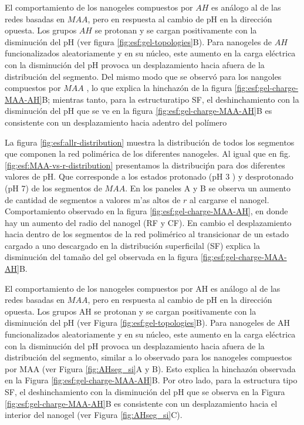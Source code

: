 El comportamiento de los nanogeles compuestos por $AH$ es an\'alogo al de las redes basadas en $MAA$, pero en respuesta al cambio de pH en la direcci\'on opuesta.
Los grupos $AH$ se protonan y se cargan positivamente con la disminuci\'on del pH (ver figura \ref{fig:esf:gel-topologies}B).
Para nanogeles de $AH$ funcionalizados aleatoriamente y en su n\'ucleo, este aumento en la carga el\'ectrica con la disminución del pH provoca un desplazamiento hacia afuera de la distribuci\'on del segmento. Del mismo modo que se observ\'o para los nangoles compuestos por $MAA$%
, lo que explica la hinchaz\'on de la figura \ref{fig:esf:gel-charge-MAA-AH}B;
mientras tanto, para la estructuratipo SF, el deshinchamiento con la disminuci\'on del pH que se ve en la figura \ref{fig:esf:gel-charge-MAA-AH}B es consistente con un desplazamiento hacia adentro del pol\'imero %


La figura \ref{fig:esf:allr-distribution} muestra la distribuci\'on de todos los segmentos que componen la red polim\'erica de los diferentes nanogeles. 
Al igual que en fig. \ref{fig:esf:MAA-vs-r-distribution} presentamos la distribuci\'pn para dos diferentes valores de pH. Que corresponde a los estados protonado (pH 3 ) y desprotonado (pH 7) de los segmentos de $MAA$.  En los paneles A y B se observa un aumento de cantidad de segmentos a valores m'as altos de $r$ al cargarse el nanogel. Comportamiento observado en la figura \ref{fig:esf:gel-charge-MAA-AH}, en donde hay un aumento del radio del nanogel (RF y CF).
En cambio el desplazamiento hacia dentro de los segmentos de la red polim\'erico al transicionar de un estado cargado a uno descargado en la distribuci\'on superficilal (SF) explica la disminuci\'on del tama\~no del gel observada en la figura \ref{fig:esf:gel-charge-MAA-AH}B.

El comportamiento de los nanogeles compuestos por AH es an\'alogo al de las redes basadas en $MAA$, pero en respuesta al cambio de pH en la direcci\'on opuesta. Los grupos AH se protonan y se cargan positivamente con la disminuci\'on del pH (ver Figura \ref{fig:esf:gel-topologies}B). Para nanogeles de AH funcionalizados aleatoriamente y en su n\'ucleo, este aumento en la carga el\'ectrica con la disminuci\'on del pH provoca un desplazamiento hacia afuera de la distribuci\'on del segmento, similar a lo observado para los nanogeles compuestos por MAA (ver Figura \ref{fig:AHseg_si}A y B). Esto explica la hinchaz\'on observada en la Figura \ref{fig:esf:gel-charge-MAA-AH}B. Por otro lado, para la estructura tipo SF, el deshinchamiento con la disminuci\'on del pH que se observa en la Figura \ref{fig:esf:gel-charge-MAA-AH}B es consistente con un desplazamiento hacia el interior del nanogel (ver Figura \ref{fig:AHseg_si}C).

